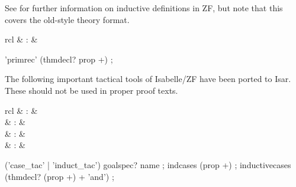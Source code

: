 \begin{isabellebody}
\begin{isamarkuptext}
  See \cite{isabelle-ZF} for further information on inductive
  definitions in ZF, but note that this covers the old-style theory
  format.%
\end{isamarkuptext}%
\isamarkuptrue%
%
\isamarkuptrue%
%
\begin{isamarkuptext}%
\begin{matharray}{rcl}
    \hypertarget{command.ZF.primrec}{\hyperlink{command.ZF.primrec}{\mbox{}}} & : &  \\
  \end{matharray}

  \begin{rail}
    'primrec' (thmdecl? prop +)
    ;
  \end{rail}%
\end{isamarkuptext}%
\isamarkuptrue%
%
\isamarkuptrue%
%
\begin{isamarkuptext}%
The following important tactical tools of Isabelle/ZF have been
  ported to Isar.  These should not be used in proper proof texts.

  \begin{matharray}{rcl}
    \hypertarget{method.ZF.case_tac}{\hyperlink{method.ZF.case_tac}{\mbox{}}}\isa{{\isachardoublequote}\isactrlsup {\isacharasterisk}{\isachardoublequote}} & : & \isarmeth \\
    \hypertarget{method.ZF.induct_tac}{\hyperlink{method.ZF.induct_tac}{\mbox{}}}\isa{{\isachardoublequote}\isactrlsup {\isacharasterisk}{\isachardoublequote}} & : & \isarmeth \\
    \hypertarget{method.ZF.ind_cases}{\hyperlink{method.ZF.ind_cases}{\mbox{}}}\isa{{\isachardoublequote}\isactrlsup {\isacharasterisk}{\isachardoublequote}} & : & \isarmeth \\
    \hypertarget{command.ZF.inductive_cases}{\hyperlink{command.ZF.inductive_cases}{\mbox{}}} & : &  \\
  \end{matharray}

  \begin{rail}
    ('case\_tac' | 'induct\_tac') goalspec? name
    ;
    indcases (prop +)
    ;
    inductivecases (thmdecl? (prop +) + 'and')
    ;
  \end{rail}%
\end{isamarkuptext}%
\isamarkuptrue%
%
\isadelimtheory
%
\endisadelimtheory
%
\isatagtheory
{}\isamarkupfalse%
%
\endisatagtheory
{\isafoldtheory}%
%
\isadelimtheory
%
\endisadelimtheory
\isanewline
\end{isabellebody}%
